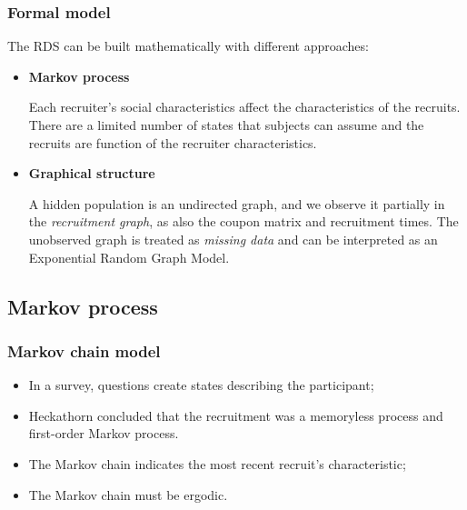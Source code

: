 \documentclass{beamer}
\newcommand{\Space}{\vspace{3ex}}
\begin{document}
\begin{frame}
  
  \frametitle{Formal model}

  The RDS can be built mathematically with different approaches: 

  \Space

  \begin{itemize}
    \justifying

    \item {\bf Markov process} \cite{heckathorn1997}
  
    Each recruiter's social characteristics affect the characteristics of the
    recruits. There are a limited number of states that subjects can assume and
    the recruits are function of the recruiter characteristics.
  \end{itemize}

  \Space

  \begin{itemize}
    \justifying

    \item {\bf Graphical structure} \cite{crawford2016}
    
    A hidden population is an undirected graph, and we observe it partially in
    the {\em recruitment graph}, as also the coupon matrix and recruitment
    times. The unobserved graph is treated as {\em missing data} and can be
    interpreted as an Exponential Random Graph Model.
  \end{itemize}  

\end{frame}

\subsection{Markov process}

\begin{frame}
  \frametitle{Markov chain model}
  
  \begin{itemize}
    \justifying
    \item In a survey, questions create states describing the participant;
    
    \Space
  
    \item Heckathorn concluded that the recruitment was a memoryless
    process and first-order Markov process.
    
    \Space

    \item The Markov chain indicates the most recent recruit's characteristic;
    
    \Space
  
    \item The Markov chain must be ergodic. 
  \end{itemize}
  
  \end{frame}
\end{document}
